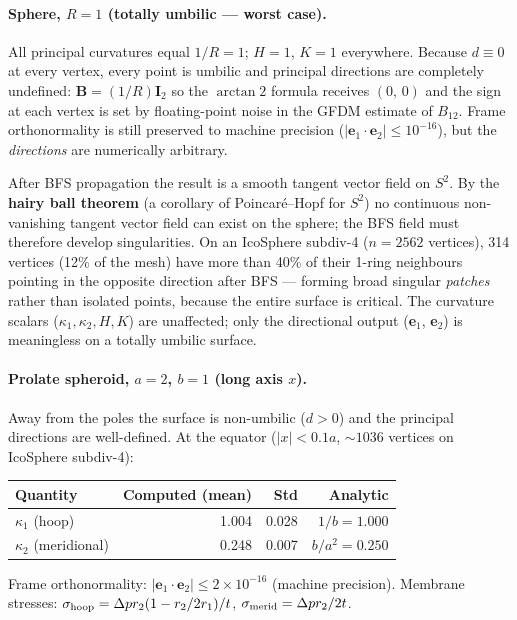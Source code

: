 \documentclass[11pt]{article}
\newcommand{\vv}[1]{\bm{#1}}          %
\newcommand{\kone}{\kappa_1}
\newcommand{\ktwo}{\kappa_2}
\begin{document}
\paragraph{Sphere, $R=1$ (totally umbilic — worst case).}
All principal curvatures equal $1/R=1$; $H=1$, $K=1$ everywhere.  Because
$d\equiv0$ at every vertex, every point is umbilic and principal directions are
completely undefined: $\mathbf{B}=(1/R)\mathbf{I}_2$ so the $\arctan2$ formula
receives $(0,\,0)$ and the sign at each vertex is set by floating-point noise in
the GFDM estimate of $B_{12}$.  Frame orthonormality is still preserved to
machine precision ($|\vv{e}_1\cdot\vv{e}_2|\le10^{-16}$), but the
\emph{directions} are numerically arbitrary.

After BFS propagation the result is a smooth tangent vector field on $S^2$.
By the \textbf{hairy ball theorem} (a corollary of Poincaré--Hopf for $S^2$)
no continuous non-vanishing tangent vector field can exist on the sphere; the
BFS field must therefore develop singularities.  On an IcoSphere subdiv-4
($n=2562$ vertices), 314 vertices (12\% of the mesh) have more than 40\% of
their 1-ring neighbours pointing in the opposite direction after BFS —
forming broad singular \emph{patches} rather than isolated points, because the
entire surface is critical.  The curvature scalars ($\kone,\ktwo,H,K$) are
unaffected; only the directional output (\textbf{e}$_1$, \textbf{e}$_2$) is
meaningless on a totally umbilic surface.

\paragraph{Prolate spheroid, $a=2$, $b=1$ (long axis $x$).}
Away from the poles the surface is non-umbilic ($d>0$) and the principal
directions are well-defined.  At the equator ($|x|<0.1a$, $\sim\!1036$
vertices on IcoSphere subdiv-4):

\begin{center}
\begin{tabular}{lrrr}
\toprule
Quantity & Computed (mean) & Std & Analytic \\
\midrule
$\kone$ (hoop)       & 1.004 & 0.028 & $1/b=1.000$ \\
$\ktwo$ (meridional) & 0.248 & 0.007 & $b/a^2=0.250$ \\
\bottomrule
\end{tabular}
\end{center}

Frame orthonormality: $|\vv{e}_1\cdot\vv{e}_2|\le2\times10^{-16}$ (machine
precision).  Membrane stresses: $\sigma_{\rm hoop}=\Delta p r_2(1-r_2/2r_1)/t$,
$\sigma_{\rm merid}=\Delta p r_2/2t$.
\end{document}
